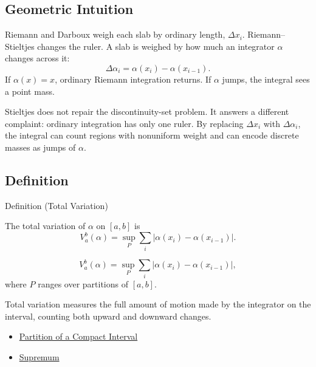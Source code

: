 \subsection*{Geometric Intuition}

\begin{exposition}
Riemann and Darboux weigh each slab by ordinary length, \(\Delta x_i\).
Riemann--Stieltjes changes the ruler. A slab is weighed by how much an
integrator \(\alpha\) changes across it:
\[
  \Delta\alpha_i=\alpha(x_i)-\alpha(x_{i-1}).
\]
If \(\alpha(x)=x\), ordinary Riemann integration returns. If \(\alpha\) jumps,
the integral sees a point mass.
\end{exposition}

\begin{remark*}[Interpretation]
Stieltjes does not repair the discontinuity-set problem. It answers a
different complaint: ordinary integration has only one ruler. By replacing
\(\Delta x_i\) with \(\Delta\alpha_i\), the integral can count regions with
nonuniform weight and can encode discrete masses as jumps of \(\alpha\).
\end{remark*}

\subsection*{Definition}

\begin{definitionbox}{Definition (Total Variation)}
\begin{definition}
\label{def:total-variation}
The total variation of \(\alpha\) on \([a,b]\) is
\[
  V_a^b(\alpha)=\sup_P\sum_i |\alpha(x_i)-\alpha(x_{i-1})|.
\]
\end{definition}
\end{definitionbox}

\begin{remark*}
\[
V_a^b(\alpha)=
\sup_{P}\sum_i\left|\alpha(x_i)-\alpha(x_{i-1})\right|,
\]
where \(P\) ranges over partitions of \([a,b]\).
\end{remark*}

\begin{remark*}[Interpretation]
Total variation measures the full amount of motion made by the integrator on
the interval, counting both upward and downward changes.
\end{remark*}

\begin{dependencies}
\begin{itemize}
  \item \hyperref[def:integration-partition]{Partition of a Compact Interval}
  \item \hyperref[def:supremum]{Supremum}
\end{itemize}
\end{dependencies}

